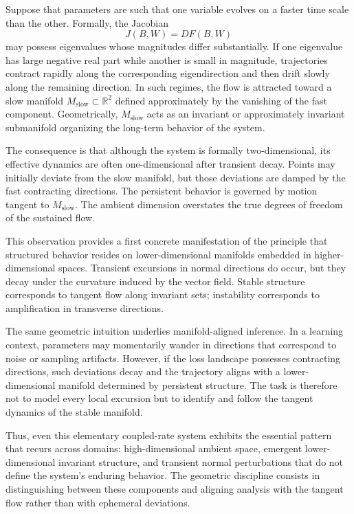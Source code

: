 \documentclass[12pt]{book}
\begin{document}
Suppose that parameters are such that one variable evolves on a faster
time scale than the other. Formally, the Jacobian
\[
J(B,W) = D F(B,W)
\]
may possess eigenvalues whose magnitudes differ substantially. If one
eigenvalue has large negative real part while another is small in
magnitude, trajectories contract rapidly along the corresponding
eigendirection and then drift slowly along the remaining direction.
In such regimes, the flow is attracted toward a slow manifold
$M_{\mathrm{slow}} \subset \mathbb{R}^2$ defined approximately by the
vanishing of the fast component. Geometrically, $M_{\mathrm{slow}}$
acts as an invariant or approximately invariant submanifold organizing
the long-term behavior of the system.

The consequence is that although the system is formally two-dimensional,
its effective dynamics are often one-dimensional after transient decay.
Points may initially deviate from the slow manifold, but those deviations
are damped by the fast contracting directions. The persistent behavior
is governed by motion tangent to $M_{\mathrm{slow}}$. The ambient
dimension overstates the true degrees of freedom of the sustained flow.

This observation provides a first concrete manifestation of the
principle that structured behavior resides on lower-dimensional
manifolds embedded in higher-dimensional spaces. Transient excursions
in normal directions do occur, but they decay under the curvature
induced by the vector field. Stable structure corresponds to tangent
flow along invariant sets; instability corresponds to amplification
in transverse directions.

The same geometric intuition underlies manifold-aligned inference.
In a learning context, parameters may momentarily wander in directions
that correspond to noise or sampling artifacts. However, if the loss
landscape possesses contracting directions, such deviations decay and
the trajectory aligns with a lower-dimensional manifold determined by
persistent structure. The task is therefore not to model every local
excursion but to identify and follow the tangent dynamics of the
stable manifold.

Thus, even this elementary coupled-rate system exhibits the essential
pattern that recurs across domains: high-dimensional ambient space,
emergent lower-dimensional invariant structure, and transient normal
perturbations that do not define the system's enduring behavior.
The geometric discipline consists in distinguishing between these
components and aligning analysis with the tangent flow rather than
with ephemeral deviations.
\end{document}
